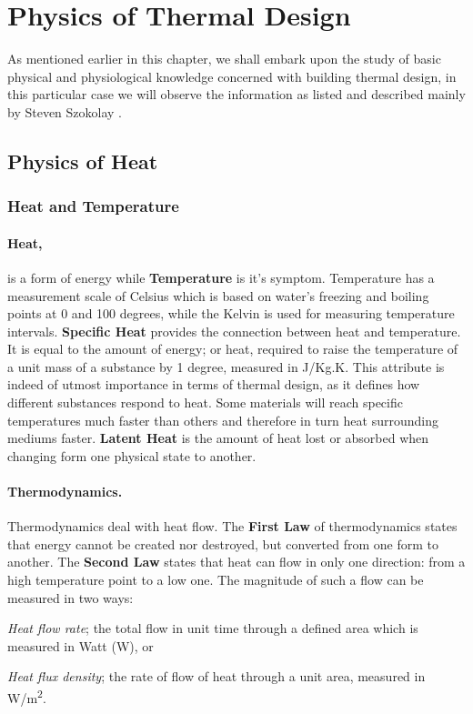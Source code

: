 \documentclass[a4paper,twoside,12pt,openright,final,oldfontcommands]{memoir}
\begin{document}
\section{Physics of Thermal Design}
As mentioned earlier in this chapter, we shall embark upon the study of basic physical and
physiological knowledge concerned with building thermal design, in this particular case we
will observe the information as listed and described mainly by Steven Szokolay \cite{szokolay08}.

\subsection{Physics of Heat}
\subsubsection{Heat and Temperature}
\paragraph{Heat,}is a form of energy while \textbf{Temperature} is it's symptom. Temperature has a
measurement scale of Celsius which is based on water's freezing and boiling points at 0 and 100
degrees, while the Kelvin is used for measuring temperature intervals. \textbf{Specific Heat}
provides the connection between heat and temperature. It is equal to the amount of energy; or heat,
required to raise the temperature of a unit mass of a substance by 1 degree, measured in J/Kg.K. This
attribute is indeed of utmost importance in terms of thermal design, as it defines how different
substances respond to heat. Some materials will reach specific temperatures much faster than others
and therefore in turn heat surrounding mediums faster. \textbf{Latent Heat} is the amount of heat
lost or absorbed when changing form one physical state to another.

\paragraph{Thermodynamics.}Thermodynamics deal with heat flow. The \textbf{First Law} of
thermodynamics states that energy cannot be created nor destroyed, but converted from one form to
another. The \textbf{Second Law} states that heat can flow in only one direction: from a high
temperature point to a low one. The magnitude of such a flow can be measured in two ways:
\begin{inparaenum}
  \item \emph{Heat flow rate}; the total flow in unit time through a defined area which is
  measured in Watt (W), or
  \item \emph{Heat flux density}; the rate of flow of heat through a unit area, measured in
  W/m\textsuperscript{2}.
\end{inparaenum}
\end{document}
